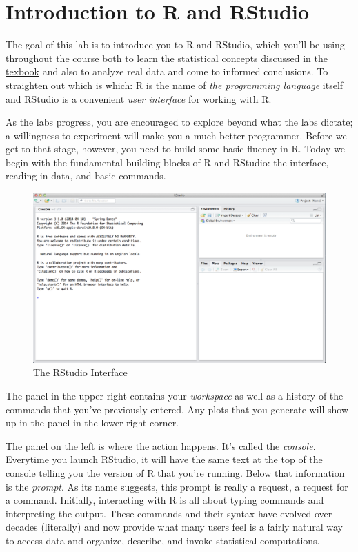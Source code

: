 \documentclass[]{book}
\theoremstyle{definition}
\theoremstyle{definition}
\theoremstyle{definition}
\theoremstyle{remark}
\begin{document}
\hypertarget{introduction-to-r-and-rstudio}{%
\chapter{Introduction to R and
RStudio}\label{introduction-to-r-and-rstudio}}

The goal of this lab is to introduce you to R and RStudio, which you'll
be using throughout the course both to learn the statistical concepts
discussed in the
\href{https://www.openintro.org/stat/textbook.php}{texbook} and also to
analyze real data and come to informed conclusions. To straighten out
which is which: R is the name of \emph{the programming language} itself
and RStudio is a convenient \emph{user interface} for working with R.

As the labs progress, you are encouraged to explore beyond what the labs
dictate; a willingness to experiment will make you a much better
programmer. Before we get to that stage, however, you need to build some
basic fluency in R. Today we begin with the fundamental building blocks
of R and RStudio: the interface, reading in data, and basic commands.

\begin{figure}
\centering
\includegraphics{./assets/images/02-01.png}
\caption{The RStudio Interface}
\end{figure}

The panel in the upper right contains your \emph{workspace} as well as a
history of the commands that you've previously entered. Any plots that
you generate will show up in the panel in the lower right corner.

The panel on the left is where the action happens. It's called the
\emph{console}. Everytime you launch RStudio, it will have the same text
at the top of the console telling you the version of R that you're
running. Below that information is the \emph{prompt}. As its name
suggests, this prompt is really a request, a request for a command.
Initially, interacting with R is all about typing commands and
interpreting the output. These commands and their syntax have evolved
over decades (literally) and now provide what many users feel is a
fairly natural way to access data and organize, describe, and invoke
statistical computations.
\end{document}
